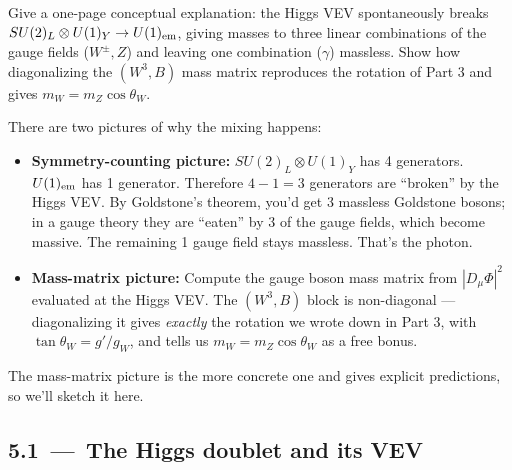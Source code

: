 \documentclass[11pt]{article}
\begin{document}
\begin{deliverbox}
Give a one-page conceptual explanation: the Higgs VEV spontaneously breaks
$SU(2)_L \otimes U(1)_Y \to U(1)_{\rm em}$, giving masses to three linear combinations of
the gauge fields ($W^\pm, Z$) and leaving one combination ($\gamma$) massless. Show how
diagonalizing the $(W^3, B)$ mass matrix reproduces the rotation of Part 3 and gives
$m_W = m_Z \cos\theta_W$.
\end{deliverbox}

\begin{strategybox}
There are two pictures of why the mixing happens:
\begin{itemize}[leftmargin=*]
  \item \textbf{Symmetry-counting picture:} $SU(2)_L \otimes U(1)_Y$ has 4 generators.
        $U(1)_{\rm em}$ has 1 generator. Therefore $4-1 = 3$ generators are ``broken'' by
        the Higgs VEV. By Goldstone's theorem, you'd get 3 massless Goldstone bosons; in a
        gauge theory they are ``eaten'' by 3 of the gauge fields, which become massive.
        The remaining 1 gauge field stays massless. That's the photon.
  \item \textbf{Mass-matrix picture:} Compute the gauge boson mass matrix from $|D_\mu \Phi|^2$
        evaluated at the Higgs VEV. The $(W^3, B)$ block is non-diagonal --- diagonalizing
        it gives \emph{exactly} the rotation we wrote down in Part 3, with
        $\tan\theta_W = g'/g_W$, and tells us $m_W = m_Z \cos\theta_W$ as a free bonus.
\end{itemize}
The mass-matrix picture is the more concrete one and gives explicit predictions, so we'll
sketch it here.
\end{strategybox}

\subsection*{5.1 \,---\, The Higgs doublet and its VEV}
\end{document}
